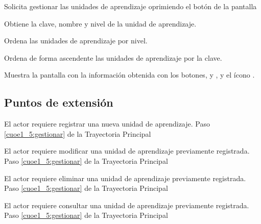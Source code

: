 \begin{UCtrayectoria}
	
	\UCpaso [\UCactor] Solicita gestionar las unidades de aprendizaje oprimiendo el botón  de la pantalla 
	
	\UCpaso [\UCsist] Obtiene la clave, nombre y nivel de la unidad de aprendizaje.
	
	\UCpaso [\UCsist] Ordena las unidades de aprendizaje por nivel.
	
	\UCpaso [\UCsist] Ordena de forma ascendente las unidades de aprendizaje por la clave.
	
	\UCpaso[\UCsist] Muestra la pantalla  con la información obtenida con los botones,  y , y el ícono \btnRegistrar. 
	\label{cuoe1_5:gestionar}
\end{UCtrayectoria}

\subsection{Puntos de extensión}

\UCExtensionPoint 
{El actor requiere registrar una nueva unidad de aprendizaje.}
{Paso \ref{cuoe1_5:gestionar} de la Trayectoria Principal}
{}

\UCExtensionPoint 
{El actor requiere modificar una unidad de aprendizaje previamente registrada.}
{Paso \ref{cuoe1_5:gestionar} de la Trayectoria Principal}
{}

\UCExtensionPoint 
{El actor requiere eliminar una unidad de aprendizaje previamente registrada.}
{Paso \ref{cuoe1_5:gestionar} de la Trayectoria Principal}
{}

\UCExtensionPoint 
{El actor requiere consultar una unidad de aprendizaje previamente registrada.}
{Paso \ref{cuoe1_5:gestionar} de la Trayectoria Principal}
{}

